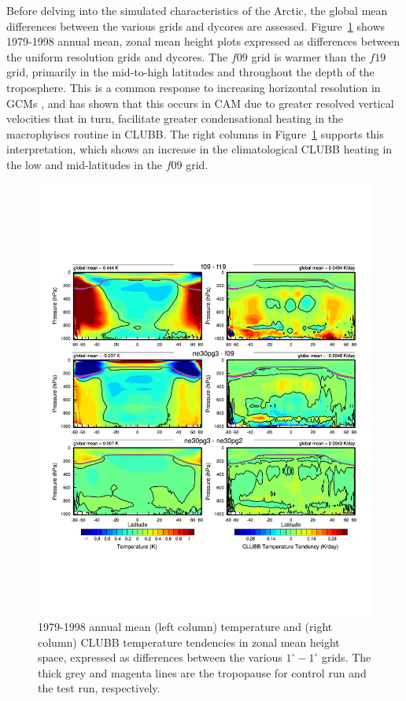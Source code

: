 \documentclass[draft]{agujournal2019}
\begin{document}
Before delving into the simulated characteristics of the Arctic, the global mean differences between the various grids and dycores are assessed. Figure~\ref{fig:dT-lores} shows 1979-1998 annual mean, zonal mean height plots expressed as differences between the uniform resolution grids and dycores. The $f09$ grid is warmer than the $f19$ grid, primarily in the mid-to-high latitudes and throughout the depth of the troposphere. This is a common response to increasing horizontal resolution in GCMs \cite{PS2002CD,RETAL2006JC}, and  has shown that this occurs in CAM due to greater resolved vertical velocities that in turn, facilitate greater condensational heating in the macrophyiscs routine in CLUBB. The right columns in Figure~\ref{fig:dT-lores} supports this interpretation, which shows an increase in the climatological CLUBB heating in the low and mid-latitudes in the $f09$ grid. 

\begin{figure}[t]
\begin{center}
         \includegraphics[width=130mm]{figs/temp_dhgt_panel_STEND_CLUBB-lores.pdf}
\end{center}
\caption{1979-1998 annual mean (left column) temperature and (right column) CLUBB temperature tendencies in zonal mean height space, expressed as differences between the various $1^{\circ}-1^{\circ}$ grids. The thick grey and magenta lines are the tropopause for control run and the test run, respectively.}
\label{fig:dT-lores}
\end{figure}
\end{document}
